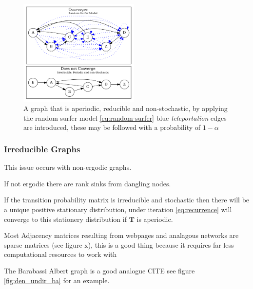 \documentclass[11pt]{article}
\begin{document}
\begin{figure}[htbp]
\centering
\includegraphics[width=6cm]{media/dot/random_surfer.dot.png}
\caption{\label{fig:rseg}A graph that is aperiodic, reducible and non-stochastic, by applying the random surfer model \eqref{eq:random-surfer} blue \emph{teleportation} edges are introduced, these may be followed with a probability of \(1 - \alpha\)}
\end{figure}

\subsubsection{Irreducible Graphs}
\label{sec:org10b066d}

This issue occurs with non-ergodic graphs.

If not ergodic there are rank sinks from dangling nodes.

If the transition probability matrix is irreducible and stochastic then there will be a unique positive stationary distribution, under iteration \eqref{eq:recurrence} will converge to this stationery distribution if \(\mathbf{T}\) is aperiodic. \cite[]{langvilleGooglePageRankScience2012}



Most Adjacency matrices resulting from webpages and analagous networks are sparse matrices (see figure x), this is a good thing because it requires far less computational resources to work with \cite[]{langvilleGooglePageRankScience2012}

The Barabassi Albert graph is a good analogue CITE
see figure \ref{fig:den_undir_ba} for an example.
\end{document}
